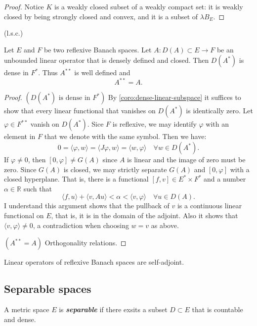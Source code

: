 \documentclass{article}
\theoremstyle{definition}
\numberwithin{equation}{section}
\newcommand{\R}{\mathbb{R}}
\begin{document}
	\begin{proof}
		Notice $K$ is a weakly closed subset of a weakly compact set: it is weakly closed by being strongly closed and convex, and it is a subset of $\lambda B_E$.
	\end{proof}
	\begin{coro}
		(l.s.c.)
	\end{coro}
	\begin{thm}
		Let $E$ and $F$ be two reflexive Banach spaces. Let $A:D(A)\subset E\to F$ be an unbounded linear operator that is densely defined and closed. Then $D(A^*)$ is dense in $F^*$. Thus $A^{**}$ is well defined and
		\[A^{**}=A.\]
	\end{thm}
	\begin{proof}
		$(D(A^*)\text{ is dense in }F^*)$ By \cref{coro:dense-linear-subspace} it suffices to show that every linear functional that vanishes on $D(A^*)$ is identically zero. Let $\varphi\in F^{**}$ vanish on $D(A^*)$. Sice $F$ is reflexive, we may identify $\varphi$ with an element in $F$ that we denote with the same symbol. Then we have:
		\[0=\langle \varphi,w\rangle=\langle J\varphi,w\rangle=\langle w,\varphi\rangle\quad\forall w\in D(A^*).\]
		If $\varphi\neq0$, then $[0,\varphi]\neq G(A)$ since $A$ is linear and the image of zero must be zero. {\color{orange} Since $G(A)$ is closed}, we may strictly separate $G(A)$ and $[0,\varphi]$ with a closed hyperplane. That is, there is a functional $[f,v]\in E^*\times F^*$ and a number $\alpha\in \R$ such that
		\[\langle f,u\rangle+\langle v,Au\rangle<\alpha<\langle v,\varphi\rangle\quad\forall u\in D(A).\]
		{\color{orange} I understand this argument shows that the pullback of $v$ is a continuous linear functional on $E$, that is, it is in the domain of the adjoint. Also it shows that $\langle v,\varphi\rangle\neq0$, a contradiction when choosing $w=v$ as above.}
		
		$(A^{**}=A)$ {\color{orange} Orthogonality relations.}
	\end{proof}
	\begin{remark}
		Linear operators of reflexive Banach spaces are self-adjoint.
	\end{remark}
	
	\subsection{Separable spaces}
	A metric space $E$ is \textbf{\textit{separable}} if there exsits a subset $D\subset E$ that is countable and dense.
	
\end{document}
